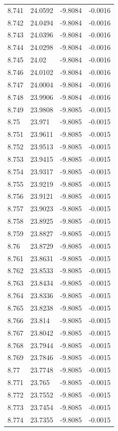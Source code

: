 \begin{tabular}{llll}
8.741 & 24.0592 & -9.8084 & -0.0016 \\
8.742 & 24.0494 & -9.8084 & -0.0016 \\
8.743 & 24.0396 & -9.8084 & -0.0016 \\
8.744 & 24.0298 & -9.8084 & -0.0016 \\
8.745 & 24.02 & -9.8084 & -0.0016 \\
8.746 & 24.0102 & -9.8084 & -0.0016 \\
8.747 & 24.0004 & -9.8084 & -0.0016 \\
8.748 & 23.9906 & -9.8084 & -0.0016 \\
8.749 & 23.9808 & -9.8085 & -0.0015 \\
8.75 & 23.971 & -9.8085 & -0.0015 \\
8.751 & 23.9611 & -9.8085 & -0.0015 \\
8.752 & 23.9513 & -9.8085 & -0.0015 \\
8.753 & 23.9415 & -9.8085 & -0.0015 \\
8.754 & 23.9317 & -9.8085 & -0.0015 \\
8.755 & 23.9219 & -9.8085 & -0.0015 \\
8.756 & 23.9121 & -9.8085 & -0.0015 \\
8.757 & 23.9023 & -9.8085 & -0.0015 \\
8.758 & 23.8925 & -9.8085 & -0.0015 \\
8.759 & 23.8827 & -9.8085 & -0.0015 \\
8.76 & 23.8729 & -9.8085 & -0.0015 \\
8.761 & 23.8631 & -9.8085 & -0.0015 \\
8.762 & 23.8533 & -9.8085 & -0.0015 \\
8.763 & 23.8434 & -9.8085 & -0.0015 \\
8.764 & 23.8336 & -9.8085 & -0.0015 \\
8.765 & 23.8238 & -9.8085 & -0.0015 \\
8.766 & 23.814 & -9.8085 & -0.0015 \\
8.767 & 23.8042 & -9.8085 & -0.0015 \\
8.768 & 23.7944 & -9.8085 & -0.0015 \\
8.769 & 23.7846 & -9.8085 & -0.0015 \\
8.77 & 23.7748 & -9.8085 & -0.0015 \\
8.771 & 23.765 & -9.8085 & -0.0015 \\
8.772 & 23.7552 & -9.8085 & -0.0015 \\
8.773 & 23.7454 & -9.8085 & -0.0015 \\
8.774 & 23.7355 & -9.8085 & -0.0015 \\

\end{tabular}
